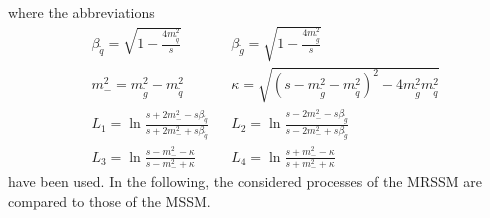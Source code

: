 where the abbreviations \cite{Beenakker:1996ch} 
\begin{align}
&\beta_{\tilde{q}} = \sqrt{1-\frac{4 m_{\tilde{q}}^2}{s}} && \beta_{\tilde{g}} = \sqrt{1-\frac{4 m_{\tilde{g}}^2}{s}}\nonumber\\
&m_-^2 = m_{\tilde{g}}^2 - m_{\tilde{q}}^2 && \kappa = \sqrt{(s-m_{\tilde{g}}^2-m_{\tilde{q}}^2)^2-4m_{\tilde{g}}^2m_{\tilde{q}}^2}\nonumber\\
& L_1 = \ln \frac{s+2m_-^2 - s\beta_{\tilde{q}}}{s+2m_-^2 + s\beta_{\tilde{q}}} && L_2= \ln \frac{s - 2m_-^2 - s\beta_{\tilde{g}}}{s - 2m_-^2 + s\beta_{\tilde{g}}}\nonumber\\
& L_3 = \ln \frac{s - m_-^2 - \kappa}{s - m_-^2 + \kappa} && L_4= \ln \frac{s + m_-^2 - \kappa}{s + m_-^2 + \kappa}
\end{align}
have been used. In the following, the considered processes of the MRSSM are compared to those of the MSSM.

